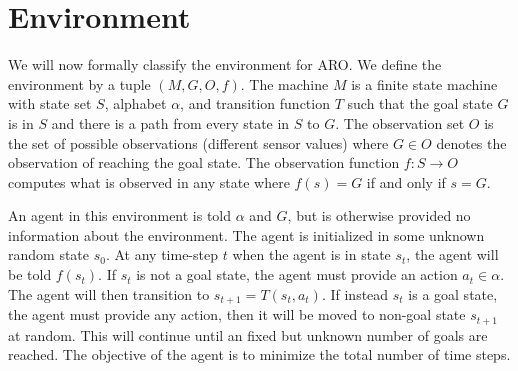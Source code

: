\documentclass[letterpaper]{article} %
\begin{document}




\section{Environment}

We will now formally classify the environment for ARO. We define the
environment by a tuple $(M, G, O, f)$. The machine $M$ is a finite
state machine with state set $S$, alphabet $\alpha$, and transition
function $T$ such that the goal state $G$ is in $S$ and there is a
path from every state in $S$ to $G$. The observation set $O$ is the
set of possible observations (different sensor values) where $G \in O$
denotes the observation of reaching the goal state. The observation
function $f: S \rightarrow O$ computes what is observed in any state
where $f(s) = G$ if and only if $s = G$.

An agent in this environment is told $\alpha$ and $G$, but is
otherwise provided no information about the environment. The agent is
initialized in some unknown random state $s_0$. At any time-step $t$
when the agent is in state $s_t$, the agent will be told $f(s_t)$. If
$s_t$ is not a goal state, the agent must provide an action
$a_t \in \alpha$. The agent will then transition to $s_{t+1} = T(s_t,
a_t)$. If instead $s_t$ is a goal state, the agent must provide any
action, then it will be moved to non-goal state $s_{t+1}$ at
random. This will continue until an fixed but unknown number of goals
are reached. The objective of the agent is to minimize the total
number of time steps.
\end{document}
